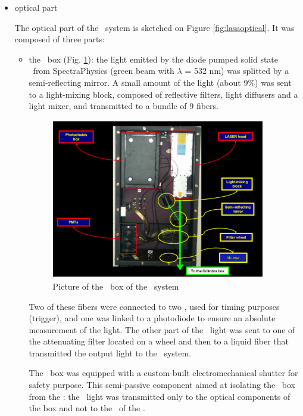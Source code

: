 \begin{itemize}
\item optical part 

	The optical part of the \lasi~system is sketched on Figure \ref{fig:lasaoptical}. It was composed of three parts:
	\begin{itemize}
	\item the \las~box (Fig. \ref{fig:lasabox}): the light emitted by the diode pumped solid state \las~from SpectraPhysics (green beam with $\lambda$ = 532 nm) was splitted by a semi-reflecting mirror. A small amount of the light (about 9\%) was sent to a light-mixing block, composed of reflective filters, light diffusers and a light mixer, and transmitted to a bundle of 9 fibers. \par
		\begin{figure}[htbp]
			\centering
			\includegraphics[height=7cm]{figures/LaserIBox.pdf}
			\caption{Picture of the \las~box of the \lasi~system}\label{fig:lasabox}
		\end{figure}	
			
		Two of these fibers were connected to two \pmts, used for timing purposes (trigger), and one was linked to a photodiode to ensure an absolute measurement of the light. The other part of the \las~light was sent to one of the attenuating filter located on a wheel and then to a liquid fiber that transmitted the output light to the \coimbra~system. \par
                 The \las~box was equipped with a custom-built electromechanical shutter for safety purpose. This semi-passive component aimed at isolating the \las~box from the \tilecal: the \las~light was transmitted only to the optical components of the box and not to the \pmt~of the \tilecal. 


\end{itemize}
\end{itemize}
